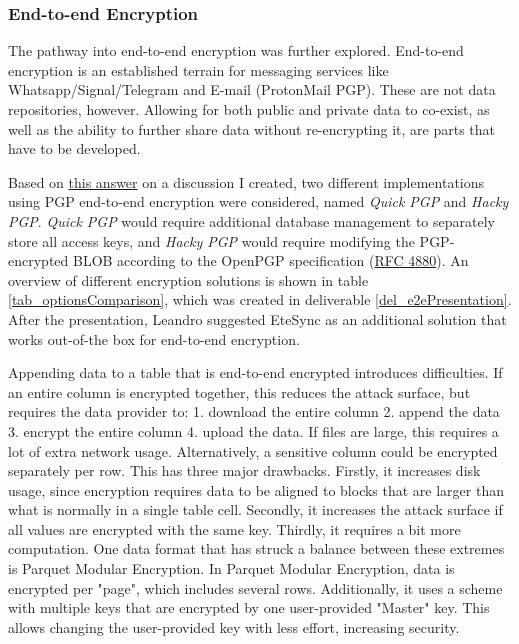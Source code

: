 \documentclass[journal, dvipsnames]{IEEEtran}
\begin{document}
\subsubsection{End-to-end Encryption}
The pathway into end-to-end encryption was further explored. End-to-end encryption is an established terrain for messaging services like Whatsapp/Signal/Telegram and E-mail (ProtonMail PGP). These are not data repositories, however. Allowing for both public and private data to co-exist, as well as the ability to further share data without re-encrypting it, are parts that have to be developed.

Based on \href{https://github.com/openpgpjs/openpgpjs/discussions/1604#discussioncomment-5099620}{this answer} on a discussion I created, two different implementations using PGP end-to-end encryption were considered, named \textit{Quick PGP} and \textit{Hacky PGP}. \textit{Quick PGP} would require additional database management to separately store all access keys, and \textit{Hacky PGP} would require modifying the PGP-encrypted BLOB according to the OpenPGP specification (\href{https://www.rfc-editor.org/rfc/rfc4880}{RFC 4880}). An overview of different encryption solutions is shown in table \ref{tab_optionsComparison}, which was created in deliverable \ref{del_e2ePresentation}.  After the presentation, Leandro suggested EteSync as an additional solution that works out-of-the box for end-to-end encryption.

Appending data to a table that is end-to-end encrypted introduces difficulties. If an entire column is encrypted together, this reduces the attack surface, but requires the data provider to: 1. download the entire column 2. append the data 3. encrypt the entire column 4. upload the data. If files are large, this requires a lot of extra network usage. Alternatively, a sensitive column could be encrypted separately per row. This has three major drawbacks. Firstly, it increases disk usage, since encryption requires data to be aligned to blocks that are larger than what is normally in a single table cell. Secondly, it increases the attack surface if all values are encrypted with the same key. Thirdly, it requires a bit more computation. One data format that has struck a balance between these extremes is Parquet Modular Encryption. In Parquet Modular Encryption, data is encrypted per "page", which includes several rows. Additionally, it uses a scheme with multiple keys that are encrypted by one user-provided "Master" key. This allows changing the user-provided key with less effort, increasing security.
\end{document}
